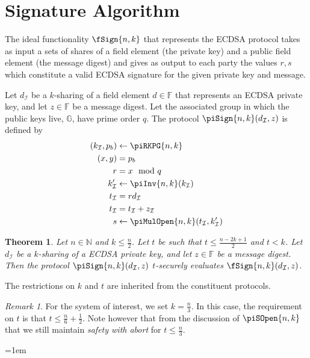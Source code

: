 \documentclass{article}
\newtheorem{theorem}{Theorem}
\theoremstyle{remark}
\newtheorem{remark}{Remark}
\newcommand{\N}{\mathbb{N}}
\newcommand{\F}{\mathbb{F}}
\newcommand{\G}{\mathbb{G}}
\begin{document}
\section{Signature Algorithm}

The ideal functionality $\fSign{n,k}$ that represents the ECDSA protocol takes
as input a sets of shares of a field element (the private key) and a public
field element (the message digest) and gives as output to each party the values
$r, s$ which constitute a valid ECDSA signature for the given private key and
message.

Let $d_\mathcal{I}$ be a $k$-sharing of a field element $d \in \F$ that
represents an ECDSA private key, and let $z \in \F$ be a message digest. Let
the associated group in which the public keys live, $\G$, have prime order $q$.
The protocol $\piSign{n,k}(d_\mathcal{I}, z)$ is defined by
\begin{align*}
	(k_\mathcal{I}, p_b) &\leftarrow \piRKPG{n,k}\\
	(x, y) &= p_b\\
	r &= x \mod q\\
	k'_\mathcal{I} &\leftarrow \piInv{n,k}(k_\mathcal{I})\\
	t_\mathcal{I} &= rd_\mathcal{I}\\
	t_\mathcal{I} &= t_\mathcal{I} + z_\mathcal{I}\\
	s &\leftarrow \piMulOpen{n,k}(t_\mathcal{I}, k'_\mathcal{I})
\end{align*}

\begin{theorem}
	Let $n \in \N$ and $k \le \frac{n}{2}$. Let $t$ be such that $t \le \frac{n
	- 2k + 1}{2}$ and $t < k$. Let $d_\mathcal{I}$ be a $k$-sharing of a ECDSA
	private key, and let $z \in \F$ be a message digest. Then the protocol
	$\piSign{n,k}(d_\mathcal{I}, z)$ $t$-securely evaluates
	$\fSign{n,k}(d_\mathcal{I}, z)$.
\end{theorem}
The restrictions on $k$ and $t$ are inherited from the constituent protocols.

\begin{remark}
	For the system of interest, we set $k = \frac{n}{3}$. In this case, the
	requirement on $t$ is that $t \le \frac{n}{6} + \frac{1}{2}$. Note however
	that from the discussion of $\piSOpen{n,k}$ that we still maintain
	\textit{safety with abort} for $t \le \frac{n}{3}$.
\end{remark}

\newpage
{%
	\emergencystretch=1em

	\printbibliography{}
}
\end{document}
